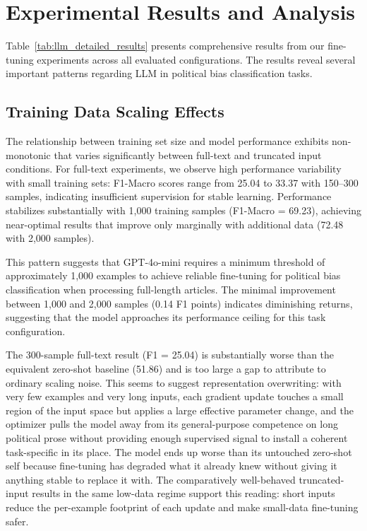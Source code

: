 \section{Experimental Results and Analysis}
\label{sec:llm-results}

Table~\ref{tab:llm_detailed_results} presents comprehensive results from our fine-tuning experiments across all evaluated configurations. The results reveal several important patterns regarding LLM  in political bias classification tasks.

\subsection{Training Data Scaling Effects}

The relationship between training set size and model performance exhibits non-monotonic  that varies significantly between full-text and truncated input conditions. For full-text experiments, we observe high performance variability with small training sets: F1-Macro scores range from 25.04 to 33.37 with 150--300 samples, indicating insufficient supervision for stable learning. Performance stabilizes substantially with 1,000 training samples (F1-Macro = 69.23), achieving near-optimal results that improve only marginally with additional data (72.48 with 2,000 samples).

This pattern suggests that GPT-4o-mini requires a minimum threshold of approximately 1,000 examples to achieve reliable fine-tuning for political bias classification when processing full-length articles. The minimal improvement between 1,000 and 2,000 samples (0.14 F1 points) indicates diminishing returns, suggesting that the model approaches its performance ceiling for this task configuration.

The 300-sample full-text result (F1 = 25.04) is substantially worse than the equivalent zero-shot baseline (51.86) and is too large a gap to attribute to ordinary scaling noise. This seems to suggest representation overwriting: with very few examples and very long inputs, each gradient update touches a small region of the input space but applies a large effective parameter change, and the optimizer pulls the model away from its general-purpose competence on long political prose without providing enough supervised signal to install a coherent task-specific in its place. The model ends up worse than its untouched zero-shot self because fine-tuning has degraded what it already knew without giving it anything stable to replace it with. The comparatively well-behaved truncated-input results in the same low-data regime support this reading: short inputs reduce the per-example footprint of each update and make small-data fine-tuning safer.

